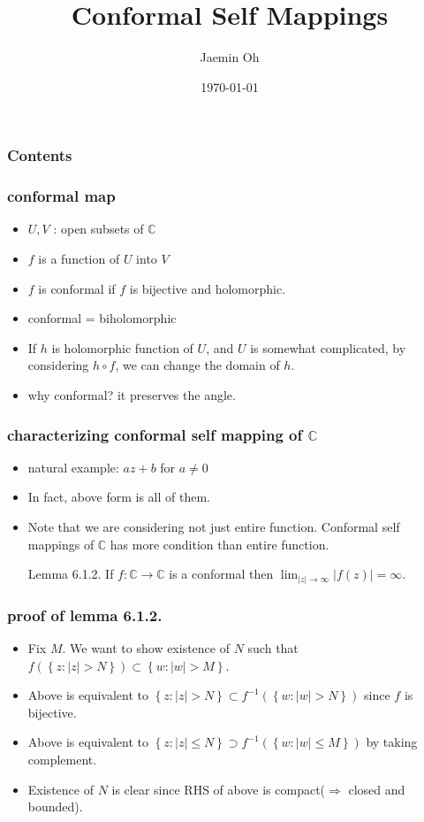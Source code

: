 \documentclass{beamer}
\title{Conformal Self Mappings}
\author{Jaemin Oh}
\institute{KAIST}
\date{\today}
\begin{document}
\frame{\titlepage}

\begin{frame}
	\frametitle{Contents}
	\tableofcontents
\end{frame}

\begin{frame}
	\frametitle{conformal map}
	\begin{itemize}
		\item $U, V$ : open subsets of $\mathbb{C}$
		\item $f$ is a function of $U$ into $V$
		\item $f$ is conformal if $f$ is bijective and holomorphic.
		\item conformal = biholomorphic
		\item If $h$ is holomorphic function of $U$, and $U$ is somewhat complicated, by considering $h \circ f$, we can change the domain of $h$.
		\item why conformal? it preserves the angle.
	\end{itemize}
\end{frame}

\begin{frame}
	\frametitle{characterizing conformal self mapping of $\mathbb{C}$}
	\begin{itemize}
		\item natural example: $az + b$ for $a \ne 0$
		\item In fact, above form is all of them.
		\item Note that we are considering not just entire function. Conformal self mappings of $\mathbb{C}$ has more condition than entire function.
			\begin{alertblock}{Lemma 6.1.2.}
				If $f: \mathbb{C} \rightarrow \mathbb{C}$ is a conformal then $\lim_{|z| \rightarrow \infty} |f(z)| = \infty$.
\end{alertblock}
	\end{itemize}
\end{frame}

\begin{frame}
	\frametitle{proof of lemma 6.1.2.}
	\begin{itemize}
		\item Fix $M$. We want to show existence of $N$ such that $f\left( \left\{ z: |z| > N \right\} \right) \subset \left\{ w: |w| > M \right\}$. 

		\item Above is equivalent to $\left\{ z : |z| > N \right\} \subset f^{-1}\left( \left\{ w: |w|>N \right\} \right)$ since $f$ is bijective. 

		\item Above is equivalent to $\left\{ z : |z| \leq N \right\} \supset f^{-1}\left( \left\{ w: |w| \leq M \right\} \right)$ by taking complement. 

		\item Existence of $N$ is clear since RHS of above is compact($\Rightarrow$ closed and bounded). 

	\end{itemize}
\end{frame}
\end{document}
